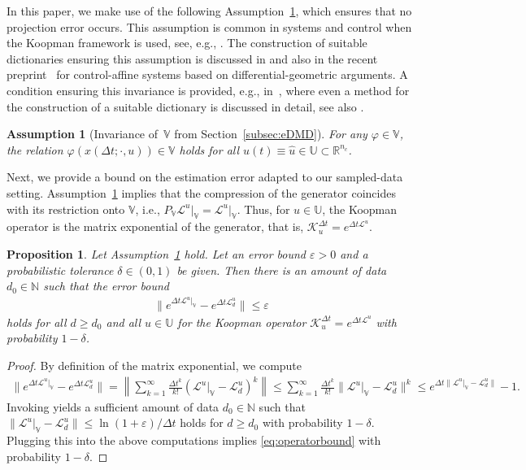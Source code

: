 \documentclass{article}
\numberwithin{equation}{section}
\newtheorem{proposition}[theorem]{Proposition}
\newtheorem{assumption}[theorem]{Assumption}
\newcommand{\R}{\mathbb{R}}
\newcommand{\nc}{n_c}
\renewcommand{\d}{d}
\newcommand{\calK}{\mathcal K}
\newcommand{\calL}{\mathcal L}
\newcommand{\bU}{\mathbb U}
\begin{document}
	\noindent In this paper, we make use of the following Assumption~\ref{ass:invariance}, which ensures that no projection error occurs. This assumption is common in systems and control when the Koopman framework is used, see, e.g., \cite{ProcBrun18,KordMezi18b}. The construction of suitable dictionaries ensuring this assumption is discussed in \cite{BrunBrun16,KordMezi20,ShiKary21} and also in the recent preprint~\cite{GadgKris22} for control-affine systems based on differential-geometric arguments. A condition ensuring this invariance is provided, e.g., in~\cite[Theorem~1]{GoswPale21}, where even a method for the construction of a suitable dictionary is discussed in detail, see also \cite[Section~III and~IV]{GoswPale21}.
	\begin{assumption}[Invariance of~$\mathbb{V}$ from Section~\ref{subsec:eDMD}]    \label{ass:invariance}
		For any $\varphi \in \mathbb{V}$, the relation $\varphi(x(\Delta t;\cdot,u)) \in \mathbb{V}$ holds for all $u(t) \equiv \hat{u} \in \bU \subset \R^{\nc}$.
	\end{assumption}
	\noindent Next, we provide a bound on the estimation error adapted to our sampled-data setting. Assumption~\ref{ass:invariance} implies that the compression of the generator coincides with its restriction onto $\mathbb{V}$, i.e., $P_\mathbb{V} \mathcal{L}^u\vert_\mathbb{V} = \mathcal{L}^u\vert_\mathbb{V}$. Thus, for $u\in \bU$, the Koopman operator is the matrix exponential of the generator, that is, $\calK^{\Delta t}_u = e^{\Delta t \mathcal{L}^u}$.
	\begin{proposition}\label{prop:generatorbound}
		Let Assumption~\ref{ass:invariance} hold.
		Let an error bound $\varepsilon>0$ and a probabilistic tolerance $\delta \in (0,1)$ be given. Then there is an amount of data $\d_0\in \mathbb{N}$ such that the error bound
		\begin{align}\label{eq:operatorbound}
		\big\|e^{\Delta t \mathcal{L}^u \vert_{\mathbb{V}}} - e^{\Delta t \calL_\d^u}\big\| \leq \varepsilon
		\end{align}
		holds for all $\d \geq \d_0$ and all $u\in \bU$ for the Koopman operator $\calK^{\Delta t}_u = e^{\Delta t \mathcal{L}^u}$ with probability $1-\delta$.
	\end{proposition}
	\begin{proof}
		By definition of the matrix exponential, we compute
		\begin{align*}
		\| e^{\Delta t \mathcal{L}^u \vert_{\mathbb{V}}} - e^{\Delta t \mathcal{L}^u_d} \| = \left\| \sum_{k=1}^\infty \frac{\Delta t^k}{k!}(\mathcal{L}^u\vert_\mathbb{V} -\mathcal{L}^u_\d)^k \right\| \leq  \sum_{k=1}^\infty \frac{\Delta t^k}{k!}\|\mathcal{L}^u\vert_\mathbb{V} -\mathcal{L}^u_\d \|^k \leq e^{\Delta t \|\mathcal{L}^u\vert_\mathbb{V} -\mathcal{L}^u_\d \|} - 1.
		\end{align*}
		Invoking \cite[Theorem 3]{SchaWort23} yields a sufficient amount of data $d_0\in \mathbb{N}$ such that $\|\mathcal{L}^u\vert_\mathbb{V} -\mathcal{L}^u_\d \| \leq \ln (1+\varepsilon)/\Delta t$ holds for $d\geq d_0$ with probability $1-\delta$. Plugging this into the above computations implies \eqref{eq:operatorbound} with probability $1-\delta$.
	\end{proof}
\end{document}
